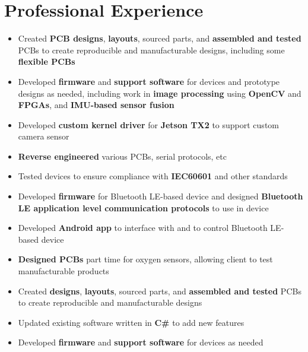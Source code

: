 \documentclass{my_resume}
\begin{document}
\section{Professional Experience}
\begin{flushleft}
  \begin{itemize}[noitemsep]
  \item Created \textbf{PCB designs}, \textbf{layouts}, sourced parts, and \textbf{assembled and tested} PCBs to create reproducible and manufacturable designs, including some \textbf{flexible PCBs}
  \item Developed \textbf{firmware} and \textbf{support software} for devices and prototype designs as needed, including work in \textbf{image processing} using \textbf{OpenCV} and \textbf{FPGAs}, and \textbf{IMU-based sensor fusion}
    \item Developed \textbf{custom kernel driver} for \textbf{Jetson TX2} to support custom camera sensor
  \item \textbf{Reverse engineered} various PCBs, serial protocols, etc
  \item Tested devices to ensure compliance with \textbf{IEC60601} and other standards
\end{itemize}
\end{flushleft}
\begin{flushleft}
  \begin{itemize}[noitemsep]
  \item Developed \textbf{firmware} for Bluetooth LE-based device and designed \textbf{Bluetooth LE application level communication protocols} to use in device
  \item Developed \textbf{Android app} to interface with and to control Bluetooth LE-based device
\end{itemize}
\end{flushleft}
\begin{flushleft}
  \begin{itemize}[noitemsep]
  \item \textbf{Designed PCBs} part time for oxygen sensors, allowing client to test manufacturable products
  \item Created \textbf{designs}, \textbf{layouts}, sourced parts, and \textbf{assembled and tested} PCBs to create reproducible and manufacturable designs
  \item Updated existing software written in \textbf{C\#} to add new features
  \item Developed \textbf{firmware} and \textbf{support software} for devices as needed
\end{itemize}
\end{flushleft}
\end{document}
